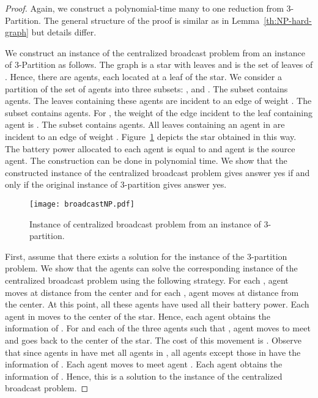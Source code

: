 \documentclass{article}
\newcommand\strat{\mbox{strategy}\xspace}
\begin{document}
\begin{proof}
Again, we construct a polynomial-time many to one reduction from 3-Partition. The general structure of the proof is similar as in Lemma~\ref{th:NP-hard-graph} but details differ.

We construct an instance  of the centralized broadcast problem from an instance of 3-Partition as follows. The graph  is a star with  leaves and  is the set of leaves of . Hence, there are  agents, each located at a leaf of the star.
We consider a partition of the set of agents into three subsets: ,  and . The subset  contains  agents. The leaves containing these agents are incident to an edge of weight . The subset  contains  agents. For  , the weight of the edge incident to the leaf containing agent  is . The subset  contains  agents. All leaves containing an agent in 
are incident to an edge of weight . Figure~\ref{fig:reducb} depicts the star obtained in this way. The battery power  allocated to each agent is equal to  and agent  is the source agent. The construction can be done in polynomial time. We show that the constructed instance of the centralized broadcast problem gives answer yes if and only if the original instance of 3-partition gives answer yes.

\begin{figure}[h]
\centering
\texttt{[image: broadcastNP.pdf]}
\caption{Instance of centralized broadcast problem from an instance of 3-partition.}
\label{fig:reducb}
\end{figure}

First, assume that there exists a solution  for the instance of the 3-partition problem. We show that the agents can solve the corresponding instance of the centralized broadcast problem using the following {\strat}. For each , agent  moves at distance  from the center and for each , agent  moves at distance  from the center. At this point, all these agents have used all their battery power. Each agent in  moves to the center of the star.
Hence, each agent  obtains the information of . For  and each of the three agents  such that , agent  moves to meet  and goes back to the center of the star. The cost of this movement is . Observe that since agents in  have met all agents in , all agents except those in  have the information of . Each agent  moves to meet agent . 
Each agent  obtains the information of . Hence, this is a solution to the instance of the centralized broadcast problem.

\medskip


\end{proof}
\end{document}
